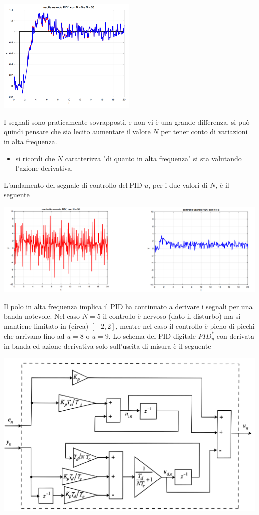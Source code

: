 \documentclass[10pt, letterpaper]{report}
\begin{document}
\begin{center}
    \includegraphics[width=0.5\textwidth]{images/simulazionePID4.png}
\end{center}
I segnali sono praticamente sovrapposti, e non vi è una grande differenza, si può quindi pensare che sia lecito aumentare il valore $N$ per tener conto di variazioni in alta frequenza.\begin{itemize}
    \item si ricordi che $N$ caratterizza "di quanto in alta frequenza" si sta valutando l'azione derivativa.
\end{itemize}
L'andamento del segnale di controllo del PID $u$, per i due valori di $N$, è il seguente
\begin{center}
    \includegraphics[width=\textwidth]{images/simulazionePID5.png}
\end{center}
Il polo in alta frequenza  implica il PID ha continuato a derivare i segnali per una banda notevole. Nel caso  \color{blue}$N=5$ \color{black} il controllo è nervoso (dato il disturbo) ma si mantiene limitato in (circa) $[-2,2]$, mentre nel caso  il controllo è pieno di picchi che arrivano fino ad $u=8$ o $u=9$.\acc 
Lo schema del PID digitale $PID_y^*$ con derivata in banda ed azione derivativa solo sull'uscita di misura è il seguente
\begin{center}
    \includegraphics[width=\textwidth]{images/schemaPidDigSuUscita.pdf}
\end{center}
\flowerLine
\end{document}
